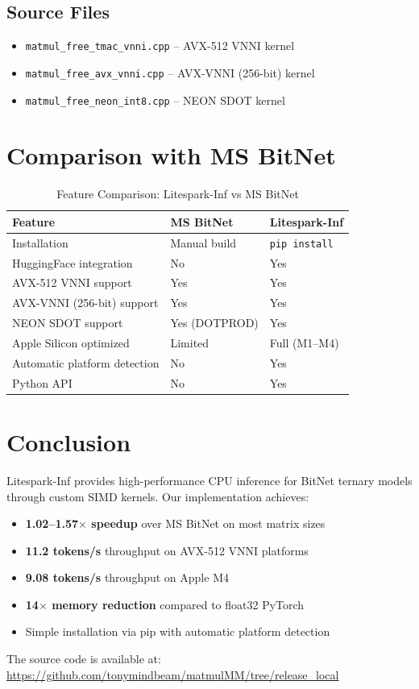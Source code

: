 \documentclass[11pt,a4paper]{article}
\begin{document}
\subsection{Source Files}

\begin{itemize}
    \item \texttt{matmul\_free\_tmac\_vnni.cpp} -- AVX-512 VNNI kernel
    \item \texttt{matmul\_free\_avx\_vnni.cpp} -- AVX-VNNI (256-bit) kernel
    \item \texttt{matmul\_free\_neon\_int8.cpp} -- NEON SDOT kernel
\end{itemize}

\section{Comparison with MS BitNet}

\begin{table}[H]
\centering
\caption{Feature Comparison: Litespark-Inf vs MS BitNet}
\label{tab:comparison}
\begin{tabular}{lll}
\toprule
\textbf{Feature} & \textbf{MS BitNet} & \textbf{Litespark-Inf} \\
\midrule
Installation & Manual build & \texttt{pip install} \\
HuggingFace integration & No & Yes \\
AVX-512 VNNI support & Yes & Yes \\
AVX-VNNI (256-bit) support & Yes & Yes \\
NEON SDOT support & Yes (DOTPROD) & Yes \\
Apple Silicon optimized & Limited & Full (M1--M4) \\
Automatic platform detection & No & Yes \\
Python API & No & Yes \\
\bottomrule
\end{tabular}
\end{table}

\section{Conclusion}

Litespark-Inf provides high-performance CPU inference for BitNet ternary models through custom SIMD kernels. Our implementation achieves:

\begin{itemize}
    \item \textbf{1.02--1.57$\times$ speedup} over MS BitNet on most matrix sizes
    \item \textbf{11.2 tokens/s} throughput on AVX-512 VNNI platforms
    \item \textbf{9.08 tokens/s} throughput on Apple M4
    \item \textbf{14$\times$ memory reduction} compared to float32 PyTorch
    \item Simple installation via pip with automatic platform detection
\end{itemize}

The source code is available at: \url{https://github.com/tonymindbeam/matmulMM/tree/release_local}
\end{document}
